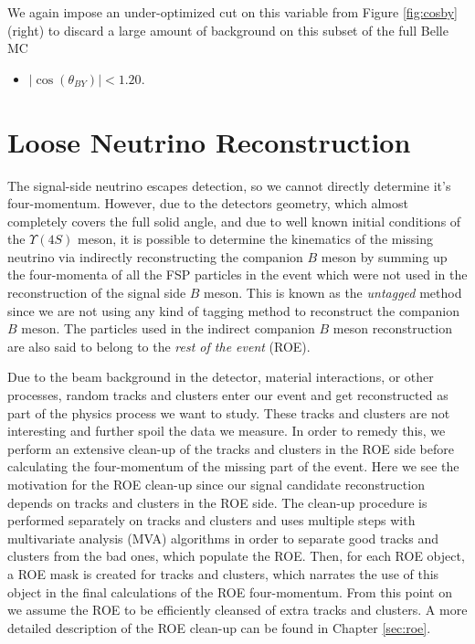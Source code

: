 We again impose an under-optimized cut on this variable from Figure \ref{fig:cosby} (right) to discard a large amount of background on this subset of the full Belle MC
\begin{itemize}
	\item $\vert \cos \left(\theta_{BY}\right) \vert < 1.20$.
\end{itemize}

\section{Loose Neutrino Reconstruction}\label{sec:loose-neutrino-reconstruction}
The signal-side neutrino escapes detection, so we cannot directly determine it's four-momentum. However, due to the detectors geometry, which almost completely covers the full solid angle, and due to well known initial conditions of the $\Upsilon(4S)$ meson, it is possible to determine the kinematics of the missing neutrino via indirectly reconstructing the companion $B$ meson by summing up the four-momenta of all the FSP particles in the event which were not used in the reconstruction of the signal side $B$ meson. This is known as the \textit{untagged} method since we are not using any kind of tagging method to reconstruct the companion $B$ meson. The particles used in the indirect companion $B$ meson reconstruction are also said to belong to the \textit{rest of the event} (ROE).

Due to the beam background in the detector, material interactions, or other processes, random tracks and clusters enter our event and get reconstructed as part of the physics process we want to study. These tracks and clusters are not interesting and further spoil the data we measure. In order to remedy this, we perform an extensive clean-up of the tracks and clusters in the ROE side before calculating the four-momentum of the missing part of the event. Here we see the motivation for the ROE clean-up since our signal candidate reconstruction depends on tracks and clusters in the ROE side. The clean-up procedure is performed separately on tracks and clusters and uses multiple steps with multivariate analysis (MVA) algorithms in order to separate good tracks and clusters from the bad ones, which populate the ROE. Then, for each ROE object, a ROE mask is created for tracks and clusters, which narrates the use of this object in the final calculations of the ROE four-momentum. From this point on we assume the ROE to be efficiently cleansed of extra tracks and clusters. A more detailed description of the ROE clean-up can be found in Chapter \ref{sec:roe}. 

